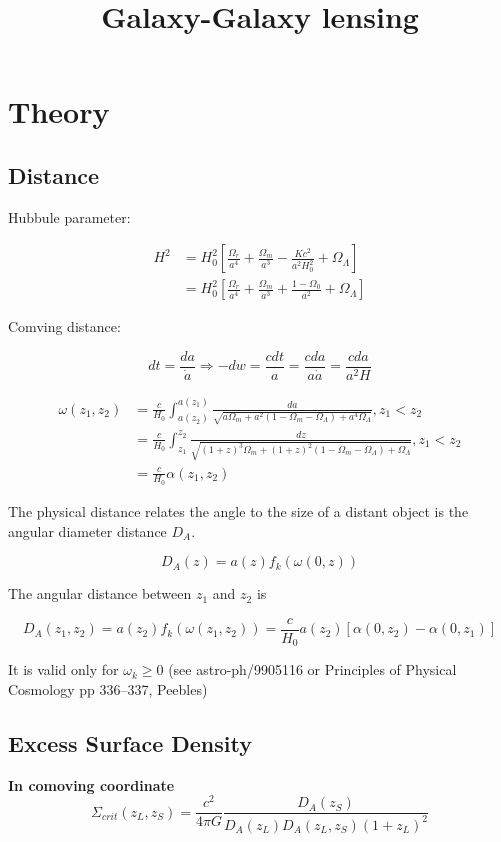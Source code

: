 \documentclass[12pt, a4paper]{article}
\begin{document}
\title{Galaxy-Galaxy lensing}


\section{Theory}

\subsection{Distance}

Hubbule parameter:

\begin{align}
H^2 &= H_0^2[\frac{\Omega_r}{a^4}+\frac{\Omega_m}{a^3}-\frac{Kc^2}{a^2H_0^2}+\Omega_{\Lambda}] \\
&=H_0^2[\frac{\Omega_r}{a^4}+\frac{\Omega_m}{a^3}+\frac{1-\Omega_0}{a^2}+\Omega_{\Lambda}] 
\end{align}

Comving distance:

$$ dt = \frac{da}{\dot{a}} \Rightarrow -dw = \frac{cdt}{a} = \frac{cda}{a\dot{a}}=\frac{cda}{a^2H}$$

\begin{align}
\omega(z_1,z_2) &= \frac{c}{H_0}\int_{a(z_2)}^{a(z_1)} \frac{da}{\sqrt{a\Omega_m + a^2(1-\Omega_m -\Omega_\Lambda) + a^4\Omega_\Lambda}}, z_1 < z_2 \\
&= \frac{c}{H_0}\int_{z_1}^{z_2} \frac{dz}{\sqrt{(1+z)^3\Omega_m + (1+z)^2(1-\Omega_m -\Omega_\Lambda) + \Omega_\Lambda}}, z_1 < z_2 \\
&= \frac{c}{H_0}\alpha(z_1, z_2) 
\end{align}

The physical distance relates the angle to the size of a distant object is the angular diameter distance $D_A$. 

$$ D_A(z) = a(z)f_k(\omega(0,z))$$

The angular distance between $z_1$ and $z_2$ is

$$D_A(z_1, z_2) = a(z_2)f_k(\omega(z_1,z_2)) = \frac{c}{H_0}a(z_2)[\alpha(0, z_2) - \alpha(0, z_1)]$$

It is valid only for $\omega_k \geq 0 $ (see astro-ph/9905116 or Principles of Physical Cosmology pp 336–337, Peebles)


\subsection{Excess Surface Density}

\textbf{In comoving coordinate}
\begin{equation}
\Sigma_{crit}(z_L, z_S) = \frac{c^2}{4\pi G}\frac{D_A (z_S)}{D_A (z_L) D_A (z_L, z_S) (1+z_L)^2}
\end{equation}
\end{document}
